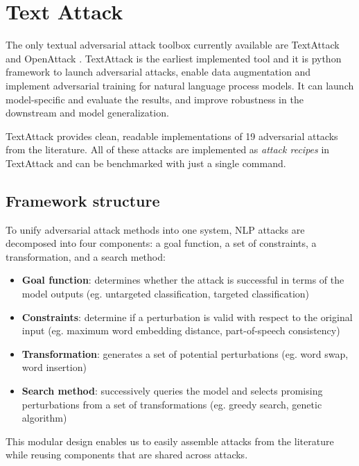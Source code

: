 \section{Text Attack}\label{sec:text-attack}
The only textual adversarial attack toolbox currently available are TextAttack \cite{journals/corr/abs-2005-05909} and OpenAttack \cite{journals/corr/abs-2009-09191}.
TextAttack is the earliest implemented tool and it is python framework to launch adversarial attacks, enable data augmentation and implement adversarial training for natural language process models. 
It can launch model-specific and evaluate the results, and improve robustness in the downstream and model generalization. 

TextAttack provides clean, readable implementations of 19 adversarial attacks from the literature.
All of these attacks are implemented as \emph{attack recipes} in TextAttack and can be benchmarked with just a single command.

\subsection{Framework structure}\label{subsec:framework-structure}

To unify adversarial attack methods into one
system, NLP attacks are decomposed into four components: a goal function, a set of constraints, a transformation, and a search method:
\begin{itemize}
    \item \textbf{Goal function}: determines whether the attack is successful in terms of the model outputs (eg. untargeted classification, targeted classification)
    \item \textbf{Constraints}: determine if a perturbation is valid with respect to the original input (eg. maximum word embedding distance, part-of-speech consistency)
    \item \textbf{Transformation}: generates a set of potential perturbations (eg. word swap, word insertion)
    \item \textbf{Search method}: successively queries the model and selects promising perturbations from a set of transformations (eg. greedy search, genetic algorithm)
\end{itemize}

This modular design enables us to easily assemble attacks from the literature while reusing components that are shared across attacks.

